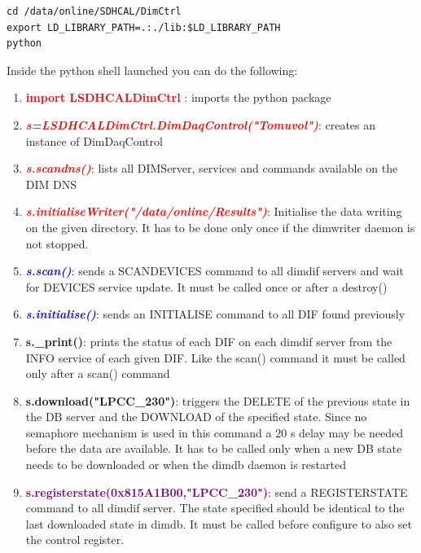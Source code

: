 \documentclass[english]{article}
\begin{document}
\begin{verbatim}
cd /data/online/SDHCAL/DimCtrl
export LD_LIBRARY_PATH=.:./lib:$LD_LIBRARY_PATH
python
\end{verbatim}  

Inside the python shell launched you can do the following:

\begin{enumerate} 
\item \textcolor{red}{ \bf  import LSDHCALDimCtrl} :  imports the python package

\item \textcolor{red}{\it \bf s=LSDHCALDimCtrl.DimDaqControl("Tomuvol")}:  creates an instance of DimDaqControl

\item \textcolor{red}{\it \bf s.scandns()}: lists all DIMServer, services and commands available on the DIM DNS  
\item \textcolor{red}{\it \bf s.initialiseWriter("/data/online/Results")}: Initialise the data writing on the given directory. It has to be done only once if the dimwriter daemon is not stopped.

\item \textcolor{blue}{\it \bf s.scan()}: sends a SCANDEVICES command to all dimdif servers and wait for DEVICES service update. It must be called once or after a destroy()


\item \textcolor{blue}{\it {\bf s.initialise()}}: sends an INITIALISE command to all DIF found previously
\item {\bf s.\_print()}: prints the status of each DIF on each dimdif server from the INFO service of each given DIF. Like the scan() command it must be called only after a scan() command

\item {\bf s.download("LPCC\_230")}: triggers the DELETE of the previous state in the DB server and the DOWNLOAD of the specified state. Since no semaphore mechanism is used in this command a 20 s delay may be needed before the data are available. It has to be called only when a new DB state needs to be downloaded or when the dimdb daemon is restarted

\item \textcolor{purple}{\bf s.registerstate(0x815A1B00,"LPCC\_230")}: send a REGISTERSTATE command to all dimdif server. The state specified should be identical to the last downloaded state in dimdb. It must be called before configure to also set the control register.


\end{enumerate}
\end{document}
